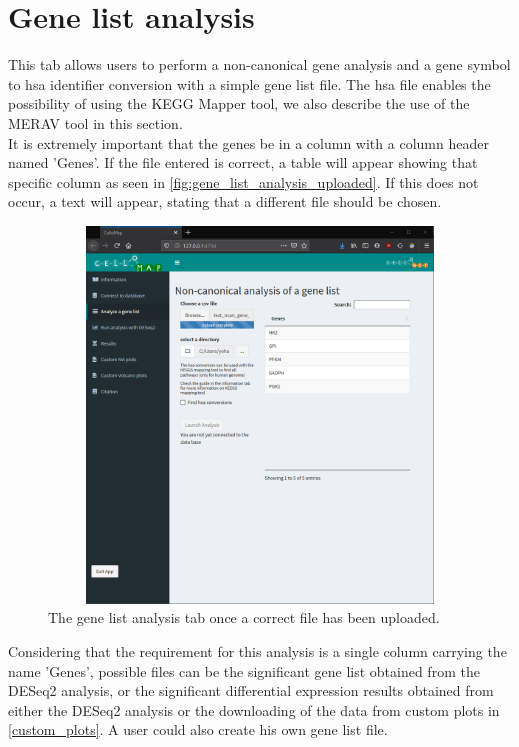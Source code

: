 \documentclass[11pt]{article}
\begin{document}
\section{Gene list analysis \label{gene_list_analysis}}
This tab allows users to perform a non-canonical gene analysis and a gene symbol to \acrshort{hsa} identifier conversion with a simple gene list file. The \acrshort{hsa} file enables the possibility of using the \acrshort{KEGG} Mapper tool, we also describe the use of the \acrshort{MERAV} tool in this section.\\
It is extremely important that the genes be in a column with a column header named 'Genes'. If the file entered is correct, a table will appear showing that specific column as seen in \autoref{fig:gene_list_analysis_uploaded}. If this does not occur, a text will appear, stating that a different file should be chosen.
\begin{figure}[h!]
\centering
\includegraphics[width=15cm,height=10cm,keepaspectratio]{gene_list_analysis.png}
\caption{The gene list analysis tab once a correct file has been uploaded.}
\label{fig:gene_list_analysis_uploaded}
\end{figure}

Considering that the requirement for this analysis is a single column carrying the name 'Genes', possible files can be the significant gene list obtained from the \acrshort{DESeq2} analysis, or the significant differential expression results obtained from either the \acrshort{DESeq2} analysis or the downloading of the data from custom plots in \autoref{custom_plots}. A user could also create his own gene list file.
\end{document}
